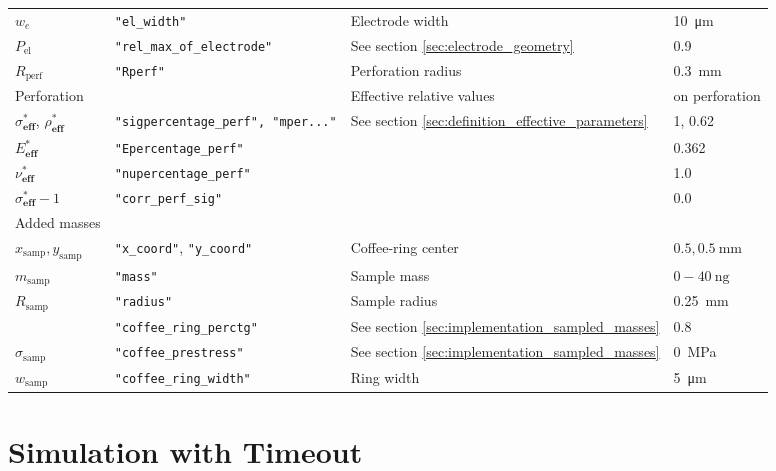 \begin{table}[h]
\begin{tabular}{llll}
        $w_e$  & \texttt{"el\_width"} & Electrode width & \SI{10}{\micro\meter} \\
        $P_\mathrm{el}$  & \texttt{"rel\_max\_of\_electrode"} & See section \ref{sec:electrode_geometry} & \SI{0.9}{}\\
        $R_\mathrm{perf}$  & \texttt{"Rperf"} & Perforation radius & \SI{0.3}{\milli\meter}\\
        Perforation&    & Effective relative values & on perforation \\
        $\sigma_\mathbf{eff}^*$, $\rho_\mathbf{eff}^*$  & \texttt{"sigpercentage\_perf", "mper..."} & See section \ref{sec:definition_effective_parameters} & 1, 0.62 \\
        $E_\mathbf{eff}^*$  & \texttt{"Epercentage\_perf"} & & 0.362 \\
        $\nu_\mathbf{eff}^*$  & \texttt{"nupercentage\_perf"} & & 1.0 \\
        $\sigma_\mathbf{eff}^*-1$  & \texttt{"corr\_perf\_sig"} & & 0.0 \\
        Added masses &    &  &  \\
        $x_\mathrm{samp}, y_\mathrm{samp}$ & \texttt{"x\_coord"}, \texttt{"y\_coord"} & Coffee-ring center & $0.5, \SI{0.5}{\milli\meter}$ \\
        $m_\mathrm{samp}$ & \texttt{"mass"} & Sample mass & $0-\SI{40}{\nano\gram}$ \\
        $R_\mathrm{samp}$ & \texttt{"radius"} & Sample radius & \SI{0.25}{\milli\meter} \\
        & \texttt{"coffee\_ring\_perctg"} & See section \ref{sec:implementation_sampled_masses} & 0.8 \\
        $\sigma_\mathrm{samp}$& \texttt{"coffee\_prestress"} & See section \ref{sec:implementation_sampled_masses} & \SI{0}{\mega\pascal} \\
        $w_\mathrm{samp}$& \texttt{"coffee\_ring\_width"} & Ring width & \SI{5}{\micro\meter} \\
    \end{tabular}
\end{table}
\newpage









\section{Simulation with Timeout}


